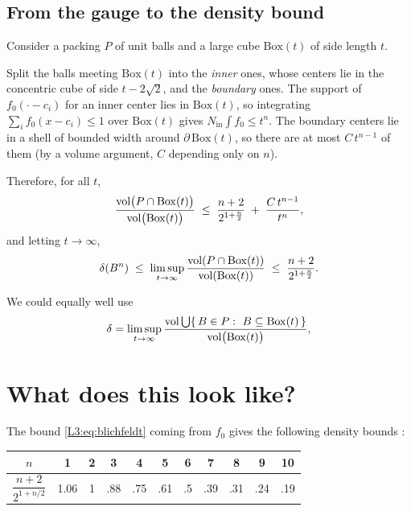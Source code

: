 \subsection*{From the gauge to the density bound}
Consider a packing $P$ of unit balls and a large cube $\mathrm{Box}(t)$ of side length $t$.
\begin{addedblock}
Split the balls meeting $\mathrm{Box}(t)$ into the \emph{inner} ones, whose centers lie in the concentric cube of side
$t-2\sqrt2$, and the \emph{boundary} ones. The support of $f_0(\cdot-c_i)$ for an inner center lies in $\mathrm{Box}(t)$, so
integrating $\sum_i f_0(x-c_i)\le 1$ over $\mathrm{Box}(t)$ gives
$N_{\mathrm{in}}\int f_0\le t^n$. The boundary centers lie in a shell of bounded width around $\partial\,\mathrm{Box}(t)$,
so there are at most $C\,t^{n-1}$ of them (by a volume argument, $C$ depending only on $n$).
\end{addedblock}
Therefore, for all $t$,
\[
  \frac{\operatorname{vol}\bigl(P\cap \mathrm{Box}(t)\bigr)}{\operatorname{vol}\bigl(\mathrm{Box}(t)\bigr)}
  \;\le\; \frac{n+2}{2^{1+\frac n2}} \;+\; \frac{C\,t^{n-1}}{t^n},
\]
%
and letting $t\to\infty$,
\begin{equation}\label{L3:eq:blichfeldt}
  \delta(B^n)\;\le\;\limsup_{t\to\infty}\frac{\operatorname{vol}(P\cap\mathrm{Box}(t))}{\operatorname{vol}(\mathrm{Box}(t))}\;\le\;\frac{n+2}{2^{1+\frac n2}}.
\end{equation}

\begin{remark}
We could equally well use
\[
  \dens=\limsup_{t\to\infty}\frac{\vol\bigcup\{\,\Ball\in P:\ \Ball\subseteq\mathrm{Box}(t)\,\}}{\vol\bigl(\mathrm{Box}(t)\bigr)},
\]
\end{remark}

\section{What does this look like?}
\label{L3:sec:landscape}

The bound \eqref{L3:eq:blichfeldt} coming from $f_0$ gives the following density bounds
:
\begin{center}
\begin{tabular}{c|cccccccccc}
\toprule
$n$ & 1 & 2 & 3 & 4 & 5 & 6 & 7 & 8 & 9 & 10\\
\midrule
$\dfrac{n+2}{2^{1+n/2}}$ & 1.06 & 1 & .88 & .75 & .61 & .5 & .39 & .31 & .24 & .19\\
\bottomrule
\end{tabular}
\end{center}

